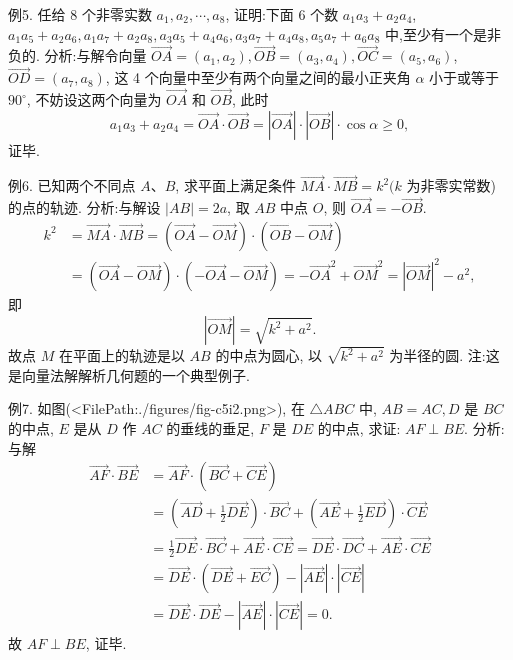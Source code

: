 例5. 任给 8 个非零实数 $a_1, a_2, \cdots, a_8$, 证明:下面 6 个数 $a_1 a_3+a_2 a_4$, $a_1 a_5+a_2 a_6, a_1 a_7+a_2 a_8, a_3 a_5+a_4 a_6, a_3 a_7+a_4 a_8, a_5 a_7+a_6 a_8$ 中,至少有一个是非负的.
分析:与解令向量 $\overrightarrow{O A}=\left(a_1, a_2\right), \overrightarrow{O B}=\left(a_3, a_4\right), \overrightarrow{O C}=\left(a_5, a_6\right)$, $\overrightarrow{O D}=\left(a_7, a_8\right)$, 这 4 个向量中至少有两个向量之间的最小正夹角 $\alpha$ 小于或等于 $90^{\circ}$, 不妨设这两个向量为 $\overrightarrow{O A}$ 和 $\overrightarrow{O B}$, 此时
$$
a_1 a_3+a_2 a_4=\overrightarrow{O A} \cdot \overrightarrow{O B}=|\overrightarrow{O A}| \cdot|\overrightarrow{O B}| \cdot \cos \alpha \geqslant 0,
$$
证毕.



例6. 已知两个不同点 $A 、 B$, 求平面上满足条件 $\overrightarrow{M A} \cdot \overrightarrow{M B}=k^2(k$ 为非零实常数) 的点的轨迹.
分析:与解设 $|A B|=2 a$, 取 $A B$ 中点 $O$, 则 $\overrightarrow{O A}=-\overrightarrow{O B}$.
$$
\begin{aligned}
k^2 & =\overrightarrow{M A} \cdot \overrightarrow{M B}=(\overrightarrow{O A}-\overrightarrow{O M}) \cdot(\overrightarrow{O B}-\overrightarrow{O M}) \\
& =(\overrightarrow{O A}-\overrightarrow{O M}) \cdot(-\overrightarrow{O A}-\overrightarrow{O M})=-\overrightarrow{O A}^2+\overrightarrow{O M}^2=|\overrightarrow{O M}|^2-a^2,
\end{aligned}
$$
即
$$
|\overrightarrow{O M}|=\sqrt{k^2+a^2} .
$$
故点 $M$ 在平面上的轨迹是以 $A B$ 的中点为圆心, 以 $\sqrt{k^2+a^2}$ 为半径的圆.
注:这是向量法解解析几何题的一个典型例子.



例7. 如图(<FilePath:./figures/fig-c5i2.png>), 在 $\triangle A B C$ 中, $A B=A C, D$ 是 $B C$ 的中点, $E$ 是从 $D$ 作 $A C$ 的垂线的垂足, $F$ 是 $D E$ 的中点, 求证: $A F \perp B E$.
分析:与解
$$
\begin{aligned}
\overrightarrow{A F} \cdot \overrightarrow{B E} & =\overrightarrow{A F} \cdot(\overrightarrow{B C}+\overrightarrow{C E}) \\
& =\left(\overrightarrow{A D}+\frac{1}{2} \overrightarrow{D E}\right) \cdot \overrightarrow{B C}+\left(\overrightarrow{A E}+\frac{1}{2} \overrightarrow{E D}\right) \cdot \overrightarrow{C E} \\
& =\frac{1}{2} \overrightarrow{D E} \cdot \overrightarrow{B C}+\overrightarrow{A E} \cdot \overrightarrow{C E}=\overrightarrow{D E} \cdot \overrightarrow{D C}+\overrightarrow{A E} \cdot \overrightarrow{C E} \\
& =\overrightarrow{D E} \cdot(\overrightarrow{D E}+\overrightarrow{E C})-|\overrightarrow{A E}| \cdot|\overrightarrow{C E}| \\
& =\overrightarrow{D E} \cdot \overrightarrow{D E}-|\overrightarrow{A E}| \cdot|\overrightarrow{C E}|=0 .
\end{aligned}
$$
故 $A F \perp B E$, 证毕.




